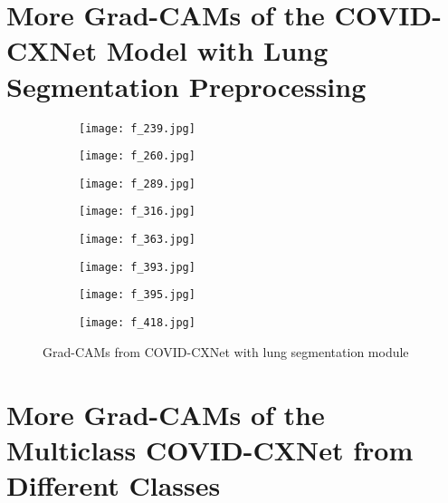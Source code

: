 \documentclass{article}
\begin{document}
\newpage
\section{More Grad-CAMs of the COVID-CXNet Model with Lung Segmentation Preprocessing} \label{appendix: C}

\begin{figure}[H]
\begin{subfigure}{0.4\linewidth}
        \centering
        \texttt{[image: f\_239.jpg]}
        \label{fig:cx2_1}
    \end{subfigure}
    \hfill
    \begin{subfigure}{0.4\linewidth}
        \centering
        \texttt{[image: f\_260.jpg]}
        \label{fig:cx2_2}
    \end{subfigure}
    \hfill
    \begin{subfigure}{0.4\linewidth}
        \centering
        \texttt{[image: f\_289.jpg]}
        \label{fig:cx2_3}
    \end{subfigure}
    \hfill
    \begin{subfigure}{0.4\linewidth}
        \centering
        \texttt{[image: f\_316.jpg]}
        \label{fig:cx2_4}
    \end{subfigure}
    \hfill
    \begin{subfigure}{0.4\linewidth}
        \centering
        \texttt{[image: f\_363.jpg]}
        \label{fig:cx2_5}
    \end{subfigure}
    \hfill
    \begin{subfigure}{0.4\linewidth}
        \centering
        \texttt{[image: f\_393.jpg]}
        \label{fig:cx2_6}
    \end{subfigure}
    \hfill
    \begin{subfigure}{0.4\linewidth}
        \centering
        \texttt{[image: f\_395.jpg]}
        \label{fig:cx2_7}
    \end{subfigure}
    \hfill
    \begin{subfigure}{0.4\linewidth}
        \centering
        \texttt{[image: f\_418.jpg]}
        \label{fig:cx2_8}
    \end{subfigure}
\caption{Grad-CAMs from COVID-CXNet with lung segmentation module}
\label{fig:more_roi_cxnet_2}
\end{figure}

\newpage
\section{More Grad-CAMs of the Multiclass COVID-CXNet from Different Classes} \label{appendix: D}
\end{document}
